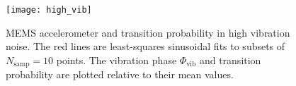 \begin{figure}[htpb!]
  \centering
    \texttt{[image: high\_vib]}
  \caption[MEMS accelerometer and transition probability in high
  vibration noise]{MEMS accelerometer and transition probability in high
  vibration noise. The red lines are least-squares sinusoidal fits to
subsets of $N_\text{samp} = 10$ points. The vibration phase
$\Phi_\text{vib}$ and transition probability are plotted relative to
their mean values.}
  \label{fig:vibration_hists}
\end{figure}

